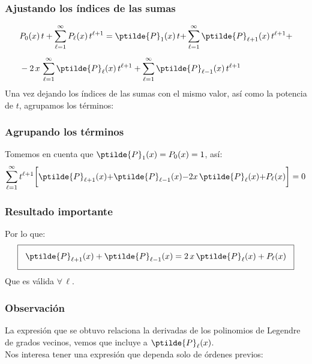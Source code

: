 \begin{frame}
\frametitle{Ajustando los índices de las sumas}
\begin{align*}
&P_{0}(x) \, t + \sum_{\ell=1}^{\infty} P_{\ell} (x) \, t^{\ell+1} = \ptilde{P}_{1} (x) \, t {+} \sum_{\ell=1}^{\infty} \ptilde{P}_{\ell+1} (x) \, t^{\ell+1} + \\[0.5em]
&- 2 \, x \, \sum_{\ell=1}^{\infty} \ptilde{P}_{\ell} (x) \, t^{\ell+1} + \sum_{\ell=1}^{\infty} \ptilde{P}_{\ell-1} (x) \, t^{\ell+1}
\end{align*}
\pause
Una vez dejando los índices de las sumas con el mismo valor, así como la potencia de $t$, agrupamos los términos:
\end{frame}
\begin{frame}
\frametitle{Agrupando los términos}
Tomemos en cuenta que $\ptilde{P}_{1}(x) = P_{0}(x) = 1$, así:
\pause
\begin{align*}
\sum_{\ell=1}^{\infty} t^{\ell+1} \bigg[ \ptilde{P}_{\ell+1} (x) {+} \ptilde{P}_{\ell-1} (x) {-} 2 x \, \ptilde{P}_{\ell} (x) {+} P_{\ell} (x) \bigg] = 0
\end{align*}
\end{frame}
\begin{frame}
\frametitle{Resultado importante}
Por lo que:
\begin{align*}
\setlength{\fboxsep}{3\fboxsep}\boxed{
\ptilde{P}_{\ell+1} (x) + \ptilde{P}_{\ell-1} (x) = 2 \, x \, \ptilde{P}_{\ell} (x) + P_{\ell} (x)
}
\end{align*}
\pause
Que es válida $\forall \, \ell$.
\end{frame}
\begin{frame}
\frametitle{Observación}
La expresión que se obtuvo relaciona la derivadas de los polinomios de Legendre de grados vecinos, vemos que incluye a $\ptilde{P}_{\ell}(x)$.
\\
\bigskip
\pause
Nos interesa tener una expresión que dependa solo de órdenes previos:
\end{frame}
